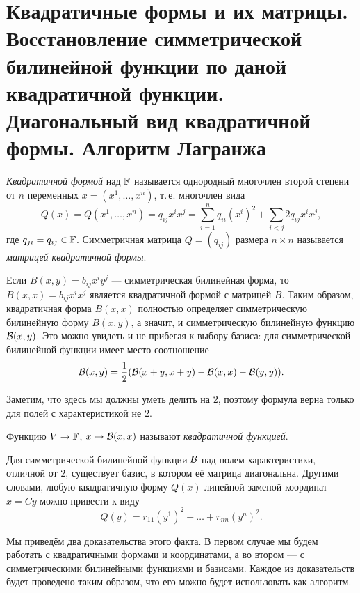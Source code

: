 \section{Квадратичные формы и их матрицы. Восстановление симметрической билинейной функции по даной квадратичной функции. Диагональный вид квадратичной формы. Алгоритм Лагранжа}

\begin{definition}
    \textit{Квадратичной формой} над $\mathbb{F}$ называется однородный многочлен второй степени от $n$ переменных $x = (x^1, \ldots, x^n)$, т.\,е. многочлен вида
    \[
        Q(x) = Q(x^1, \ldots, x^n) = q_{ij}x^ix^j = \sum_{i = 1}^nq_{ii}(x^i)^2 + \sum_{i < j}2q_{ij}x^ix^j,
    \]
    где $q_{ji} = q_{ij} \in \mathbb{F}$. Симметричная матрица $Q = (q_{ij})$ размера $n \times n$ называется \textit{матрицей квадратичной формы}.
\end{definition}

Если $B(x, y) = b_{ij}x^iy^j$ --- симметрическая билинейная форма, то $B(x, x) = b_{ij}x^ix^j$ является квадратичной формой с матрицей $B$. Таким образом, квадратичная форма $B(x, x)$ полностью определяет симметрическую билинейную форму $B(x, y)$, а значит, и симметрическую билинейную функцию $\mathcal{B}(x, y)$. Это можно увидеть и не прибегая к выбору базиса: для симметрической билинейной функции имеет место соотношение
\[
    \mathcal{B}(x, y) = \frac{1}{2}(\mathcal{B}(x + y, x + y) - \mathcal{B}(x, x) - \mathcal{B}(y, y)).
\]

\begin{remark}
    Заметим, что здесь мы должны уметь делить на $2$, поэтому формула верна только для полей с характеристикой не $2$.
\end{remark}

\begin{definition}
    Функцию $V \to \mathbb{F}$, $x \mapsto \mathcal{B}(x, x)$ называют \textit{квадратичной функцией}.
\end{definition}

\begin{theorem}
    Для симметрической билинейной функции $\mathcal{B}$ над полем характеристики, отличной от $2$, существует базис, в котором её матрица диагональна. Другими словами, любую квадратичную форму $Q(x)$ линейной заменой координат $x = Cy$ можно привести к виду
    \[
        Q(y) = r_{11}(y^1)^2 + \ldots + r_{nn}(y^n)^2.
    \]
\end{theorem}

Мы приведём два доказательства этого факта. В первом случае мы будем работать с квадратичными формами и координатами, а во втором --- с симметрическими билинейными функциями и базисами. Каждое из доказательств будет проведено таким образом, что его можно будет использовать как алгоритм.

